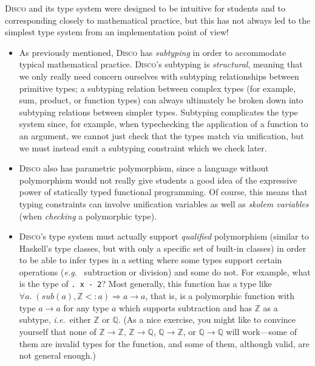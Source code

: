 \documentclass[copyright,creativecommons,12pt]{eptcs}
\newcommand{\disco}{\textsc{Disco}\xspace}
\newcommand{\ie}{\emph{i.e.}\ }
\newcommand{\eg}{\emph{e.g.}\ }
\newcommand{\Z}{\mathbb{Z}}
\newcommand{\Q}{\mathbb{Q}}
\begin{document}
\disco and its type system were designed to be intuitive for students
and to corresponding closely to mathematical practice, but this has
not always led to the simplest type system from an implementation
point of view!

\begin{itemize}
\item As previously mentioned, \disco has \emph{subtyping} in order to
  accommodate typical mathematical practice.  \disco's subtyping is
  \emph{structural}, meaning that we only really need concern
  ourselves with subtyping relationships between primitive types; a
  subtyping relation between complex types (for example, sum, product,
  or function types) can always ultimately be broken down into
  subtyping relations between simpler types.  Subtyping complicates
  the type system since, for example, when typechecking the
  application of a function to an argument, we cannot just check that
  the types match via unification, but we must instead emit a
  subtyping constraint which we check later.

\item \disco also has parametric polymorphism, since a language
  without polymorphism would not really give students a good idea of
  the expressive power of statically typed functional programming.  Of
  course, this means that typing constraints can involve unification
  variables as well as \emph{skolem variables} (when \emph{checking} a
  polymorphic type).

\item \disco's type system must actually support \emph{qualified}
  polymorphism (similar to Haskell's type classes, but with only a
  specific set of built-in classes) in order to be able to infer types
  in a setting where some types support certain operations (\eg
  subtraction or division) and some do not.  For example, what is the
  type of \texttt{\x. x - 2}?  Most generally, this function
  has a type like
  $\forall a.\; (\textit{sub}(a), \Z <: a) \Rightarrow a \to a$, that
  is, is a polymorphic function with type $a \to a$ for any type $a$
  which supports subtraction and has $\Z$ as a subtype, \ie either
  $\Z$ or $\Q$.  (As a nice exercise, you might like to convince
  yourself that none of $\Z \to \Z$, $\Z \to \Q$, $\Q \to \Z$, or $\Q
  \to \Q$ will work---some of them are invalid types for the function,
  and some of them, although valid, are not general enough.)


\end{itemize}
\end{document}
